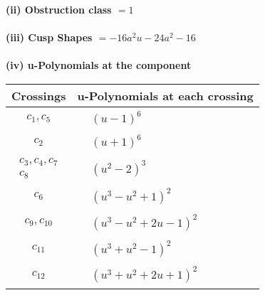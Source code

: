 \documentclass[1p]{elsarticle_modified}
\theoremstyle{definition}
\begin{document}
\flushleft \textbf{(ii) Obstruction class $= 1$}\\~\\
\flushleft \textbf{(iii) Cusp Shapes $= -16 a^2 u-24 a^2-16$}\\~\\
\newpage\renewcommand{\arraystretch}{1}
\flushleft \textbf{(iv) u-Polynomials at the component}\newline \\
\begin{tabular}{m{50pt}|m{274pt}}
Crossings & \hspace{64pt}u-Polynomials at each crossing \\
\hline $$\begin{aligned}c_{1},c_{5}\end{aligned}$$&$\begin{aligned}
&(u-1)^6
\end{aligned}$\\
\hline $$\begin{aligned}c_{2}\end{aligned}$$&$\begin{aligned}
&(u+1)^6
\end{aligned}$\\
\hline $$\begin{aligned}c_{3},c_{4},c_{7}\\c_{8}\end{aligned}$$&$\begin{aligned}
&(u^2-2)^3
\end{aligned}$\\
\hline $$\begin{aligned}c_{6}\end{aligned}$$&$\begin{aligned}
&(u^3- u^2+1)^2
\end{aligned}$\\
\hline $$\begin{aligned}c_{9},c_{10}\end{aligned}$$&$\begin{aligned}
&(u^3- u^2+2 u-1)^2
\end{aligned}$\\
\hline $$\begin{aligned}c_{11}\end{aligned}$$&$\begin{aligned}
&(u^3+u^2-1)^2
\end{aligned}$\\
\hline $$\begin{aligned}c_{12}\end{aligned}$$&$\begin{aligned}
&(u^3+u^2+2 u+1)^2
\end{aligned}$\\
\hline
\end{tabular}\\~\\
\end{document}
